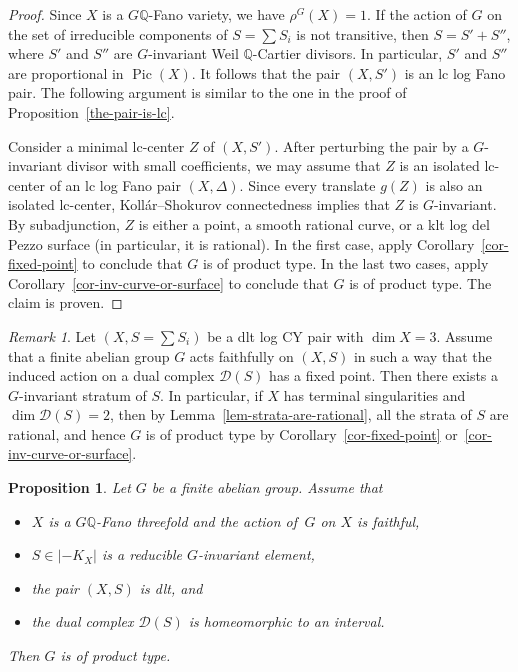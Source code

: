 \documentclass[11pt]{amsart}
\numberwithin{equation}{section}
\newtheorem{proposition}[thm]{Proposition}
\theoremstyle{definition}
\theoremstyle{remark}
\newtheorem{remark}[thm]{Remark}
\DeclareMathOperator{\Pic}{Pic}
\begin{document}
\begin{proof}
Since $X$ is a $G\mathbb{Q}$-Fano variety, we have $\rho^G(X)=1$. If the action of $G$ on the set of irreducible components of $S=\sum S_i$ is not transitive, then $S=S'+S''$, where $S'$ and $S''$ are $G$-invariant Weil $\mathbb{Q}$-Cartier divisors. In particular, $S'$ and $S''$ are proportional in $\Pic(X)$. It follows that the pair $(X, S')$ is an lc log Fano pair. 
The following argument is similar to the one in the proof of Proposition~\ref{the-pair-is-lc}.

Consider a minimal lc-center $Z$ of $(X, S')$. After perturbing the pair by a $G$-invariant divisor with small coefficients, we may assume that $Z$ is an isolated lc-center of an lc log Fano pair $(X,\Delta)$. Since every translate $g(Z)$ is also an isolated lc-center, Koll\'ar--Shokurov connectedness implies that $Z$ is $G$-invariant. By subadjunction, $Z$ is either a point, a smooth rational curve, or a klt log del Pezzo surface (in particular, it is rational).  In the first case, apply Corollary~\ref{cor-fixed-point} to conclude that $G$ is of product type.  In the last two cases, apply Corollary~\ref{cor-inv-curve-or-surface} to conclude that $G$ is of product type.  The claim is proven.
\end{proof}

\begin{remark}
\label{rem-fixed-point-on-dual-complex}
Let $(X, S=\sum S_i)$ be a dlt log CY pair with $\dim X=3$. 
Assume that a finite abelian group $G$ acts faithfully on $(X, S)$ in such a way that the induced action on a dual complex $\mathcal{D}(S)$ has a fixed point. Then there exists a $G$-invariant stratum of $S$. In particular, if $X$ has terminal singularities and $\dim \mathcal{D}(S)=2$, then by Lemma~\ref{lem-strata-are-rational}, all the strata of $S$ are rational, and hence $G$ is of product type by Corollary~\ref{cor-fixed-point} or~\ref{cor-inv-curve-or-surface}.
\end{remark}

\begin{proposition}
\label{prop-reducible}
Let $G$ be a finite abelian group. 
Assume that 
\begin{itemize}
\item
$X$ is a $G\mathbb{Q}$-Fano threefold and the action of\, $G$ on $X$ is faithful,
\item 
$S\in |-K_X|$ is a reducible $G$-invariant element,
\item
the pair $(X, S)$ is dlt, and 
\item
the dual complex $\mathcal{D}(S)$ is homeomorphic to an interval. 
\end{itemize}
Then $G$ is of product type.
\end{proposition}
\end{document}
